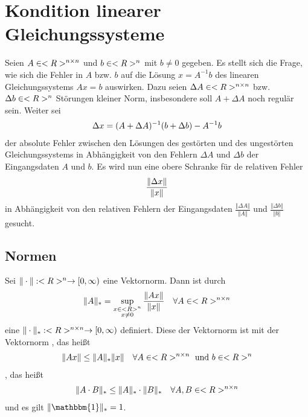\section{Kondition linearer Gleichungssysteme}

Seien $A\in<R>^{n\times n}$ und $b\in<R>^n$ mit $b\neq 0$ gegeben. Es stellt sich die Frage, wie sich die Fehler in $A$ bzw. $b$ auf die Lösung $x=A^{-1}b$ des linearen Gleichungssystems $Ax=b$ auswirken. Dazu seien $\Delta A\in<R>^{n\times n}$ bzw. $\Delta b\in<R>^n$ Störungen kleiner Norm, insbesondere soll $A+\Delta A$ noch regulär sein. Weiter sei
\begin{align}
	\Delta x = (A+\Delta A)^{-1}(b+\Delta b) - A^{-1}b\notag
\end{align}
der absolute Fehler zwischen den Lösungen des gestörten und des ungestörten Gleichungssystems in Abhängigkeit von den Fehlern $\Delta A$ und $\Delta b$ der Eingangsdaten $A$ und $b$. Es wird nun eine obere Schranke für de relativen Fehler 
\begin{align}
	\frac{\Vert \Delta x\Vert}{\Vert x\Vert}\notag
\end{align}
in Abhängigkeit von den relativen Fehlern der Eingangsdaten $\frac{\Vert \Delta A\Vert}{\Vert A\Vert}$ und $\frac{\Vert \Delta b\Vert}{\Vert b\Vert}$ gesucht.

\subsection{Normen}

\begin{proposition}
	Sei $\Vert\cdot\Vert:<R>^n\to [0,\infty)$ eine Vektornorm. Dann ist durch
	\begin{align}
		\Vert A\Vert_\ast = \sup_{\substack{x\in<R>^n \\ x\neq 0}} \frac{\Vert Ax\Vert}{\Vert x\Vert} \quad\forall A\in<R>^{n\times n}\notag
	\end{align}
	eine  $\Vert \cdot\Vert_\ast:<R>^{n\times n}\to[0,\infty)$ definiert. Diese der Vektornorm  ist mit der Vektornorm , das heißt
	\begin{align}
		\Vert Ax\Vert \le \Vert A\Vert_\ast\Vert x\Vert\quad\forall A\in<R>^{n\times n}\text{ und } b\in<R>^n\notag
	\end{align}
	, das heißt
	\begin{align}
		\Vert A\cdot B\Vert_\ast \le \Vert A\Vert_\ast\cdot \Vert B \Vert_\ast\quad\forall A,B\in<R>^{n\times n}\notag
	\end{align}
	und es gilt $\Vert \mathbbm{1}\Vert_\ast = 1$.
\end{proposition}


